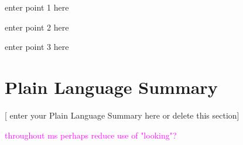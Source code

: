 \documentclass[draft]{agujournal2019}
\newcommand{\rez}{\textcolor{magenta}}
\begin{document}

\begin{keypoints}
\item enter point 1 here
\item enter point 2 here
\item enter point 3 here
\end{keypoints}

%
%

%
%


\begin{abstract}
[ enter your Abstract here ]
\end{abstract}

\section*{Plain Language Summary}
[ enter your Plain Language Summary here or delete this section]

\rez{throughout ms perhaps reduce use of "looking"?}

%
\end{document}
